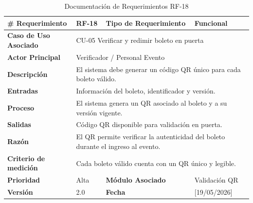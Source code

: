 \documentclass[12pt,letterpaper]{article}
\begin{document}
\begin{table}[H]
\centering
\scriptsize
\renewcommand{\arraystretch}{1.05}
\setlength{\tabcolsep}{3pt}

\newlength{\anchoceldaRFdieciocho}
\setlength{\anchoceldaRFdieciocho}{\dimexpr\textwidth-2.7cm-8\tabcolsep-5\arrayrulewidth\relax}

\begin{tabularx}{\textwidth}{|p{2.7cm}|X|p{2.8cm}|X|}
\hline
\textbf{\# Requerimiento} & RF-18 & \textbf{Tipo de Requerimiento} & Funcional \\ \hline

\textbf{Caso de Uso Asociado} & 
\multicolumn{3}{p{\anchoceldaRFdieciocho}|}{CU-05 Verificar y redimir boleto en puerta} \\ \hline

\textbf{Actor Principal} & 
\multicolumn{3}{p{\anchoceldaRFdieciocho}|}{Verificador / Personal Evento} \\ \hline

\textbf{Descripción} & 
\multicolumn{3}{p{\anchoceldaRFdieciocho}|}{El sistema debe generar un código QR único para cada boleto válido.} \\ \hline

\textbf{Entradas} & 
\multicolumn{3}{p{\anchoceldaRFdieciocho}|}{Información del boleto, identificador y versión.} \\ \hline

\textbf{Proceso} & 
\multicolumn{3}{p{\anchoceldaRFdieciocho}|}{El sistema genera un QR asociado al boleto y a su versión vigente.} \\ \hline

\textbf{Salidas} & 
\multicolumn{3}{p{\anchoceldaRFdieciocho}|}{Código QR disponible para validación en puerta.} \\ \hline

\textbf{Razón} & 
\multicolumn{3}{p{\anchoceldaRFdieciocho}|}{El QR permite verificar la autenticidad del boleto durante el ingreso al evento.} \\ \hline

\textbf{Criterio de medición} & 
\multicolumn{3}{p{\anchoceldaRFdieciocho}|}{Cada boleto válido cuenta con un QR único y legible.} \\ \hline

\textbf{Prioridad} & Alta & \textbf{Módulo Asociado} & Validación QR \\ \hline

\textbf{Versión} & 2.0 & \textbf{Fecha} & [19/05/2026] \\ \hline

\end{tabularx}

\caption{Documentación de Requerimientos RF-18}
\label{tab:documentacion_requerimientos_rf18}
\normalsize
\end{table}
\end{document}
